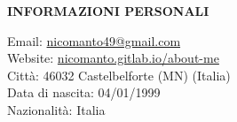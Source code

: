 \begin{minipage}[t]{0.3\textwidth}
		\textbf{INFORMAZIONI PERSONALI}
\end{minipage}%
\hfill
\hfill
\begin{minipage}[t]{0.6\textwidth}
	Email: \href{mailto:me@somewhere.com}{nicomanto49@gmail.com} \\
	Website: \href{nicomanto.gitlab.io/about-me}{nicomanto.gitlab.io/about-me} \\
	Città: 46032 Castelbelforte (MN) (Italia) \\
	Data di nascita: 04/01/1999 \\
	Nazionalità: Italia\\
\end{minipage}%


